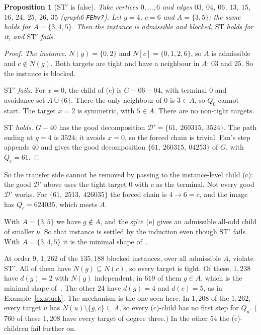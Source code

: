 \documentclass[11pt]{amsart}
\newtheorem{proposition}[theorem]{Proposition}
\theoremstyle{definition}
\newcommand{\cD}{\mathcal D}
\newcommand{\ST}{\mathrm{ST}}
\begin{document}
\begin{proposition}[$\ST'$ is false]\label{prop:stprime}
Take vertices $0,\dots,6$ and edges $03$, $04$, $06$, $13$, $15$, $16$, $24$, $25$, $26$, $35$ (graph6
\texttt{FEhv?}). Let $g=4$, $c=6$ and $A=\{3,5\}$; the same holds for $A=\{3,4,5\}$. Then the
instance is admissible and blocked, $\ST$ holds for it, and $\ST'$ fails.
\end{proposition}

\begin{proof}
\emph{The instance.} $N(g)=\{0,2\}$ and $N[c]=\{0,1,2,6\}$, so $A$ is admissible and $c\notin N(g)$.
Both targets are tight and have a neighbour in $A$: $03$ and $25$. So the instance is blocked.

\emph{$\ST'$ fails.} For $x=0$, the child of (c) is $G-06-04$, with terminal $0$ and avoidance set
$A\cup\{6\}$. There the only neighbour of $0$ is $3\in A$, so $Q_0$ cannot start. The target $x=2$
is symmetric, with $5\in A$. There are no non-tight targets.

\emph{$\ST$ holds.} $G-40$ has the good decomposition $\cD'=\{61,\ 260315,\ 3524\}$. The path ending
at $g=4$ is $3524$; it avoids $x=0$, so the forced chain is trivial. Fan's step appends $40$ and
gives the good decomposition $\{61,\ 260315,\ 04253\}$ of $G$, with $Q_c=61$.
\end{proof}

So the transfer side cannot be removed by passing to the instance-level child (c): the good
$\cD'$ above uses the tight target $0$ with $c$ as the terminal. Not every good $\cD'$ works. For
$\{61,\ 2513,\ 426035\}$ the forced chain is $4\to6=c$, and the image has $Q_c=624035$, which meets
$A$.

With $A=\{3,5\}$ we have $g\notin A$, and the split (e) gives an admissible all-odd child of smaller
$\nu$. So that instance is settled by the induction even though $\ST'$ fails. With $A=\{3,4,5\}$ it
is the minimal shape of~\cite[Corollary~5.6(5)]{L1S}.

At order $9$, $1{,}262$ of the $135{,}188$ blocked instances, over all admissible $A$, violate
$\ST'$. All of them have $N(g)\subseteq N(c)$, so every target is tight. Of these, $1{,}238$ have
$d(g)=2$ with $N(g)$ independent; in $619$ of them $g\in A$, which is the minimal
shape of~\cite[Corollary~5.6(5)]{L1S}. The other $24$ have $d(g)=4$ and $d(c)=5$, as in
Example~\ref{ex:stuck}. The mechanism is the one seen here. In $1{,}208$ of the
$1{,}262$, every target $u$ has $N(u)\setminus\{g,c\}\subseteq A$, so every (c)-child has no first
step for $Q_u$. ($760$ of these $1{,}208$ have every target of degree three.) In the other $54$ the
(c)-children fail further on.
\end{document}
